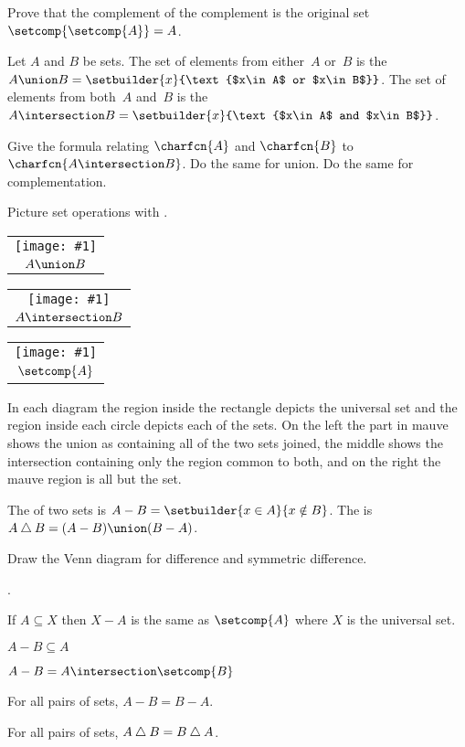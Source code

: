 \documentclass{ibl}
\makeatletter
\newcommand{\grf}[2]{\begin{tabular}{@{}c@{}}\texttt{[image: \#1]} \\ #2\end{tabular}}
\makeatother
\begin{document}
\begin{ex}
Prove that the complement of the complement is the original set
  $\setcomp{\setcomp{A}}=A$. 
\end{ex}

\begin{df}
Let $A$ and $B$ be sets.
The set of elements 
from either~$A$ or~$B$ is the 
$A\union B=\setbuilder{x}{\text{$x\in A$ or $x\in B$}}$.  
The set of elements 
from both~$A$ and~$B$ is the  
$A\intersection B=\setbuilder{x}{\text{$x\in A$ and $x\in B$}}$.  
\end{df}

\begin{ex}
Give the formula relating $\charfcn{A}$ and $\charfcn{B}$ to
  $\charfcn{A\intersection B}$.
Do the same for union.
Do the same for complementation.
\end{ex}


Picture set operations with .
\begin{center}
  \grf{asy/venn_union.pdf}{$A\union B$}
  \hspace*{3em}
  \grf{asy/venn_int.pdf}{$A\intersection B$}
  \hspace*{3em}
  \grf{asy/venn_comp.pdf}{$\setcomp{A}$}
\end{center}
In each diagram
the region inside the rectangle depicts the universal set and the 
region inside each circle depicts each of the sets.
On the left the part in mauve shows 
the union as containing all of the two sets joined, 
the middle shows the intersection
containing only the region common to both,
and on the right the mauve region is all but the set.

\begin{df}
The  of two sets is $A-B=\setbuilder{x\in A}{x\notin B}$.  
The  is 
$A\symdiff B=(A-B)\union(B-A)$.
\end{df}

\begin{ex}
Draw the Venn diagram for difference and symmetric difference.  
\end{ex}

\begin{ex} \pord.
\begin{exes}
\item If $A\subseteq X$ then $X-A$ is the same as $\setcomp{A}$ where
$X$ is the universal set.     
\item $A-B\subseteq A$
\item $A-B=A\intersection\setcomp{B}$
\item For all pairs of sets, $A-B=B-A$.
\item For all pairs of sets, $A\mathbin{\triangle} B=B\mathbin{\triangle} A$.
\end{exes}
\end{ex}
\end{document}
